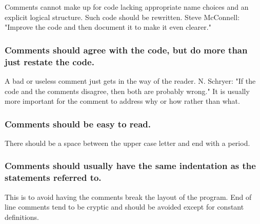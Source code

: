 \documentclass[titlepage,a4paper,12pt]{article}
\begin{document}
 Comments cannot make up
for code lacking appropriate name choices and an explicit logical
structure. Such code should be rewritten. Steve McConnell: "Improve
the code and then document it to make it even clearer."

\subsubsection{Comments should agree with the code, but do more than just restate
the code.}

 A bad or useless comment just gets in the way of the
reader. N. Schryer: "If the code and the comments disagree, then
both are probably wrong." It is usually more important for the
comment to address why or how rather than what.

\subsubsection{Comments should be
easy to read.}
There should be a space between the %
upper case letter and end with a period.

\subsubsection{Comments should usually have the same indentation as the statements
referred to.}
 This is to avoid having the comments break the layout
of the program. End of line comments tend to be cryptic and should
be avoided except for constant definitions.
\end{document}

